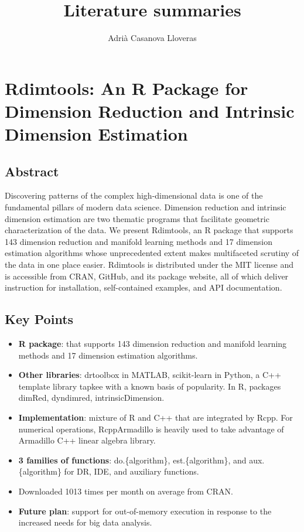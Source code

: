 \documentclass[a4paper,12pt]{article}
\title{Literature summaries}
\author{Adrià Casanova Lloveras}
\begin{document}
\maketitle

\tableofcontents
\pagebreak

\section{Rdimtools: An R Package for Dimension Reduction
and Intrinsic Dimension Estimation \texorpdfstring{\cite{Rdimtools}}{}}
\label{sec:rdimtools}


\subsection{Abstract}

Discovering patterns of the complex high-dimensional data is one of the fundamental pillars of modern data science. Dimension reduction and intrinsic dimension estimation are two thematic programs that facilitate geometric characterization of the data. We present Rdimtools, an R package that supports 143 dimension reduction and manifold learning methods and 17 dimension estimation algorithms whose unprecedented extent makes multifaceted scrutiny of the data in one place easier. Rdimtools is distributed under the MIT license and is accessible from CRAN, GitHub, and its package website, all of which deliver instruction for installation, self-contained examples, and API documentation.

\subsection{Key Points}

\begin{itemize}
    \item \textbf{R package}: that supports 143 dimension reduction and manifold learning methods and 17 dimension estimation algorithms.
    \item \textbf{Other libraries}: drtoolbox in MATLAB, scikit-learn in Python, a C++ template library tapkee with a known basis of popularity. In R, packages
    dimRed, dyndimred, intrinsicDimension.
    \item \textbf{Implementation}: mixture of R and C++ that are integrated by Rcpp. For numerical operations, RcppArmadillo is heavily used to take advantage of Armadillo C++ linear algebra library.
    \item  \textbf{3 families of functions}: do.\{algorithm\}, est.\{algorithm\},
    and aux.\{algorithm\} for DR, IDE, and auxiliary functions.
    \item Downloaded 1013 times per month on average from CRAN.
    \item \textbf{Future plan}: support for out-of-memory execution in response to the increased needs for big data analysis.
\end{itemize}
\end{document}
